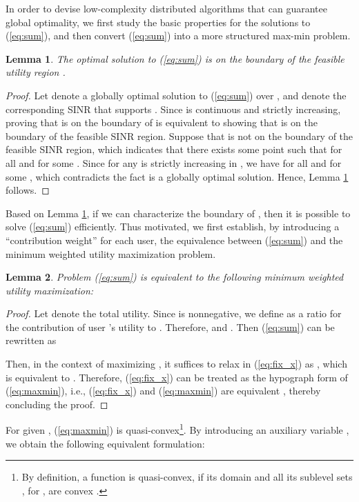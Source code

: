\documentclass[10pt,journal,letterpaper,compsoc]{IEEEtran}
\newtheorem{lm}{Lemma}[section]
\begin{document}
In order to devise low-complexity distributed algorithms that can guarantee global optimality, we first study the basic properties for the solutions to (\ref{eq:sum}), and then convert (\ref{eq:sum}) into a more structured max-min problem.

\begin{lm}
The optimal solution to (\ref{eq:sum}) is on the boundary of the feasible utility region .
\label{lm:boundary}
\end{lm}
\begin{proof}
Let  denote a globally optimal solution to (\ref{eq:sum}) over , and  denote the corresponding SINR that supports . Since  is continuous and strictly increasing,  proving that  is on the boundary of  is equivalent to showing that  is on the boundary of the feasible SINR region. Suppose that  is not on the boundary of the feasible SINR region, which indicates that there exists some point  such that  for all  and  for some . Since  for any  is strictly increasing in , we have  for all  and  for some , which contradicts the fact  is a globally optimal solution. Hence, Lemma \ref{lm:boundary} follows.
\end{proof}

Based on Lemma \ref{lm:boundary}, if we can characterize the boundary of , then it is possible to solve (\ref{eq:sum}) efficiently. Thus motivated, we first establish, by introducing a ``contribution weight'' for each user, the equivalence between (\ref{eq:sum}) and the minimum weighted utility maximization problem.
\begin{lm}
Problem (\ref{eq:sum}) is equivalent to the following minimum weighted utility maximization:

\label{lm:maxmin}
\end{lm}
\begin{proof}
Let  denote the total utility. Since  is nonnegative, we define  as a ratio for the contribution of user 's utility to . Therefore,  and . Then (\ref{eq:sum}) can be rewritten as

Then, in the context of maximizing , it suffices to relax  in (\ref{eq:fix_x}) as , which is equivalent to . Therefore, (\ref{eq:fix_x}) can be treated as the hypograph form of (\ref{eq:maxmin}), i.e., (\ref{eq:fix_x}) and (\ref{eq:maxmin}) are equivalent \cite{boyd:2004}, thereby concluding the proof.
\end{proof}



For given , (\ref{eq:maxmin}) is quasi-convex\footnote{By definition, a function  is quasi-convex, if its domain  and all its sublevel sets , for , are convex \cite{boyd:2004}.}. By introducing an auxiliary variable , we obtain the following equivalent formulation:
\end{document}
